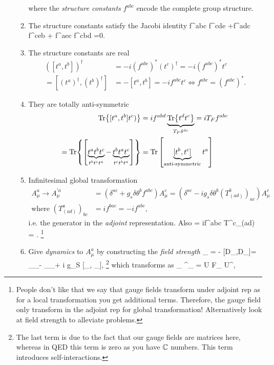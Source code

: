 \begin{enumerate}
\begin{enumerate}
		\ese 
		where the \emph{structure constants} $f^{abc}$ encode the complete group structure. 
		\item The structure constants satisfy the Jacobi identity
		\bse 
		f^{abc} f^{cde} +f^{adc} f^{ceb} + f^{aec} f^{cbd} =0.
		\ese 
		\item The structure constants are real
		\begin{align*}  
			([t^a,t^b])^\dagger &= -i (f^{abc})^* (t^c)^\dagger = - i (f^{abc})^* t^c \\
			= [(t^a)^\dagger, (t^b)^\dagger] &= -[t^a,t^b] = -i f^{abc} t^c \Leftrightarrow f^{abc} = (f^{abc})^*.
		\end{align*} 
		\item They are totally anti-symmetric
		\begin{align*} 
			\Tr{[t^a,t^b] t^c)} &= i f^{abd} \underbrace{\Tr{t^d t^c}}_{T_F \delta^{dc}} = i T_F f^{abc} \\
			= \Tr{\left[\underbrace{t^a t^b t^c}_{t^b t^c t^a} - \underbrace{t^b t^a t^c}_{t^c t^b t^a}\right]} &= \Tr \left[\underbrace{[t^b,t^c]}_{\text{anti-symmetric}} t^a\right]
		\end{align*} 
		\item Infinitesimal global transformation 
		\begin{align*}
			A^a_\mu \rightarrow A^{\prime a}_\mu &= (\delta^{ac} + g_s \delta \theta^b f^{abc} ) A^c_\mu = (\delta^{ac} - i g_s \delta \theta^b (T^b_{(ad)})_{ac}) A^c_\mu \\
			\text{where  } (T^a_{(ad)})_{bc} &= i f^{bac} = - if^{abc},
		\end{align*}
		i.e. the generator in the \emph{adjoint} representation. Also
		\bse 
		[T^a_{(ad)} ,T^b_{(ad)}] = if^{abc} T^c_{(ad)} = .
		\ese 
\footnote{ 
		People don't like that we say that gauge fields transform under adjoint rep as for a local transformation you get additional terms. Therefore, the gauge field only transform in the adjoint rep for global transformation! Alternatively look at field strength to alleviate problems.}
		\item Give \emph{dynamics} to $A^a_\mu$ by constructing the \emph{field strength}
		\bse 
		_{\mu \nu} = -  [D_\mu ,D_\nu ]= \partial_\mu \mA_\nu - \partial_\nu \mA_\mu + i g_S [\mA_\mu, \mA_\nu ],
		\ese \footnote{The last term is due to the fact that our gauge fields are matrices here, whereas in QED this term is zero as you have $\mathbb{C}$ numbers. This term introduces self-interactions.}
		which transforms as
		\bse 
		\mF_{\mu \nu} \rightarrow \mF^\prime_{\mu \nu} = U F_{\mu \nu}  U^\dagger,

\end{enumerate}
\end{enumerate}
